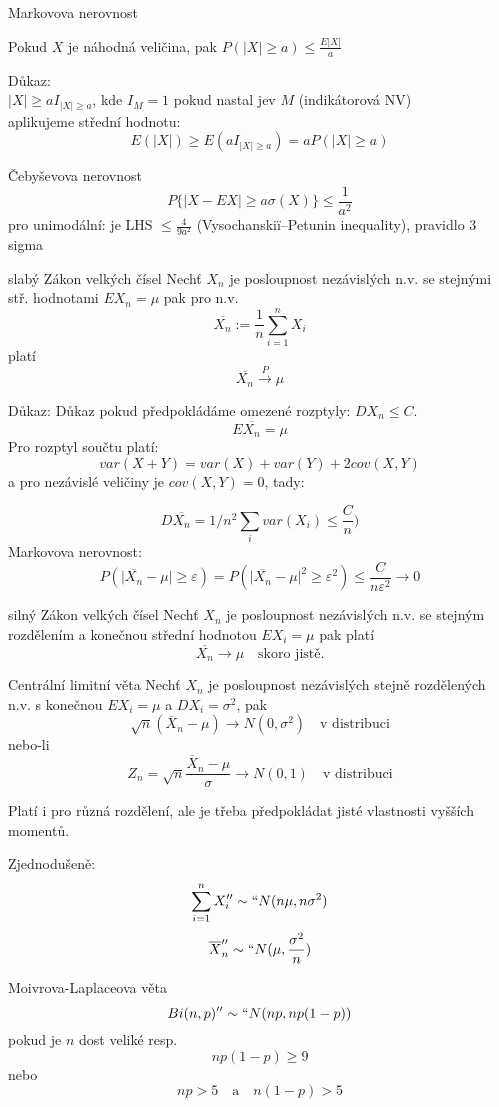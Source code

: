 \documentclass[smaller]{beamer}
\def\to{\rightarrow}
\def\abs#1{\lvert#1\rvert}
\def\ol#1{\overline{#1}}
\def\eps{\varepsilon}
\begin{document}
\begin{frame}{Markovova nerovnost}
\begin{theorem}
 Pokud $X$ je náhodná veličina, pak $P(\abs{X}\ge a) \le \frac{E\abs{X}}{a}$
\end{theorem}
Důkaz:\\
$\abs{X}\ge aI_{\abs{X}\ge a} $, kde $I_M=1$ pokud nastal jev $M$ (indikátorová NV)\\
aplikujeme střední hodnotu:
\[
  E(\abs{X}) \ge E(aI_{\abs{X}\ge a}) = a P(\abs{X}\ge a)
\]
\end{frame}

\begin{frame}{Čebyševova nerovnost}
\[
   P\{\abs{X-EX}\ge a \sigma(X)\} \le \frac{1}{a^2}
\]
pro unimodální: je LHS $\le \frac{4}{9a^2}$ (Vysochanskiï–Petunin inequality), pravidlo $3$ sigma 

\end{frame}



\begin{frame}{slabý Zákon velkých čísel }
Nechť $X_n$ je posloupnost nezávislých n.v. se stejnými stř. hodnotami $EX_n=\mu$ pak
pro n.v.
\[
  \overline{X_n}:= \frac{1}{n} \sum_{i=1}^n X_i
\]
platí
\[
 \overline{X_n} \stackrel{P}{\to} \mu
\]
\end{frame}

\begin{frame}{Důkaz:}
Důkaz pokud předpokládáme omezené rozptyly: $DX_n \le C$.
\[
  E\overline{X_n} = \mu
\]
Pro rozptyl součtu platí:
\[
  var(X+Y) = var(X) + var(Y) + 2cov(X,Y)
\]
a pro nezávislé veličiny je $cov(X,Y) = 0$, tady: 

\[
D\overline{X_n} = 1/{n^2} \sum_i var(X_i)\le \frac{C}{n} )
\]
Markovova nerovnost: 
\[
  P(\abs{\overline{X_n} - \mu} \ge \eps ) = P(\abs{\overline{X_n} - \mu}^2 \ge \eps^2 ) \le \frac{C}{n\eps^2} \to 0
\]
\end{frame}



\begin{frame}{silný Zákon velkých čísel}
Nechť $X_n$ je posloupnost nezávislých n.v. se stejným rozdělením a konečnou střední hodnotou $EX_i = \mu$ pak
platí
\[
 \overline{X_n} \to \mu \quad \text{skoro jistě.}
\]
\end{frame}

\begin{frame}{Centrální limitní věta}
Nechť $X_n$ je posloupnost nezávislých stejně rozdělených n.v. s konečnou $EX_i =\mu$ a $DX_i =\sigma^2$, pak 
\[
  \sqrt{n}(\ol{X}_n -\mu)\to N(0, \sigma^2)\quad\text{v distribuci}
\]
nebo-li
\[
  Z_n=\sqrt{n}\frac{\ol{X}_n-\mu}{\sigma} \to N(0,1)\quad\text{v distribuci}
\]

Platí i pro různá rozdělení, ale je třeba předpokládat jisté vlastnosti vyšších momentů.

Zjednodušeně: 
\[
 \sum_{i=1}^{n} X_i  ''\sim `` N(n\mu, n\sigma^2)
\]
\[
 \ol{X}_n ''\sim`` N(\mu, \frac{\sigma^2}{n})
\]


\end{frame}

\begin{frame}{Moivrova-Laplaceova věta}
\[
 Bi(n,p) ''\sim`` N(np, np(1-p) )
\]
pokud je $n$ dost veliké resp.
\[
 np(1-p) \ge 9
\]
nebo
\[
 np > 5\quad \text{a} \quad n(1-p) > 5
\]


\end{frame}
\end{document}
